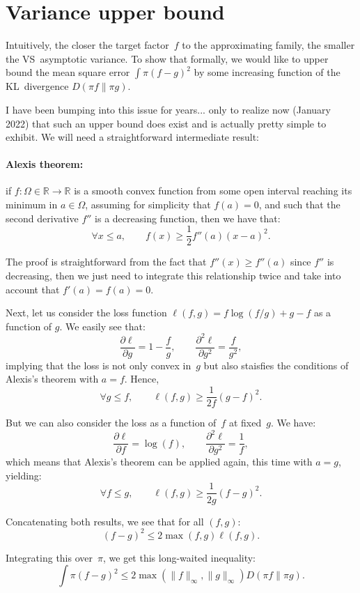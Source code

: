 \documentclass{article}
\begin{document}
\section{Variance upper bound}

Intuitively, the closer the target factor~$f$ to the approximating family, the smaller the VS~asymptotic variance. To show that formally, we would like to upper bound the mean square error $\int\pi(f-g)^2$ by some increasing function of the KL~divergence $D(\pi f\|\pi g)$. 

I have been bumping into this issue for years... only to realize now (January 2022) that such an upper bound does exist and is actually pretty simple to exhibit. We will need a straightforward intermediate result:

\paragraph{Alexis theorem:} if $f:\Omega\in\mathbb{R}\to \mathbb{R}$ is a smooth convex function from some open interval reaching its minimum in $a\in\Omega$, assuming for simplicity that $f(a)=0$, and such that the second derivative $f''$ is a decreasing function, then we have that:
$$
\forall x \leq a,
\qquad
f(x) \geq \frac{1}{2} f''(a) (x - a)^2 .
$$

The proof is straightforward from the fact that $f''(x) \geq f''(a)$ since $f''$ is decreasing, then we just need to integrate this relationship twice and take into account that $f'(a)=f(a)=0$.

Next, let us consider the loss function $\ell(f,g)=f\log(f/g)+g-f$ as a function of $g$. We easily see that:
$$
\frac{\partial\ell}{\partial g} = 1 - \frac{f}{g},
\qquad
\frac{\partial^2\ell}{\partial g^2} = \frac{f}{g^2},
$$
implying that the loss is not only convex in~$g$ but also staisfies the conditions of Alexis's theorem with $a=f$. Hence,
$$
\forall g\leq f,
\qquad
\ell(f, g) \geq \frac{1}{2f} (g - f)^2. 
$$

But we can also consider the loss as a function of~$f$ at fixed~$g$. We have:
$$
\frac{\partial\ell}{\partial f} = \log(f),
\qquad
\frac{\partial^2\ell}{\partial g^2} = \frac{1}{f},
$$
which means that Alexis's theorem can be applied again, this time with $a=g$, yielding:
$$
\forall f\leq g,
\qquad
\ell(f, g) \geq \frac{1}{2g} (f - g)^2. 
$$

Concatenating both results, we see that for all $(f, g)$:
$$
(f-g)^2 \leq 2 \max(f, g)\ell(f, g).
$$

Integrating this over~$\pi$, we get this long-waited inequality:
$$
\int \pi (f-g)^2 \leq 2\max(\|f\|_\infty, \|g\|_\infty) D(\pi f\|\pi g).
$$
\end{document}
